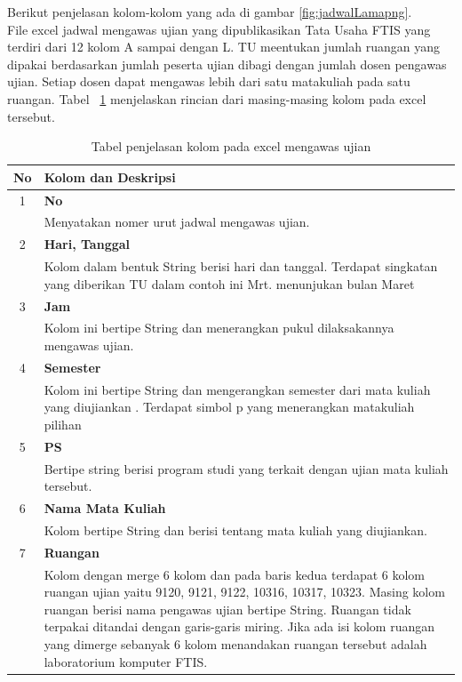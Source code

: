 Berikut penjelasan kolom-kolom yang ada di gambar \ref{fig:jadwalLamapng}.\\
File excel jadwal mengawas ujian yang dipublikasikan Tata Usaha FTIS yang terdiri dari 12 kolom A sampai dengan L. TU meentukan jumlah ruangan yang dipakai berdasarkan jumlah peserta ujian dibagi dengan jumlah dosen pengawas ujian. Setiap dosen dapat mengawas lebih dari satu matakuliah pada satu ruangan.  
Tabel ~\ref{tab:penjelasan_kolom} menjelaskan rincian dari masing-masing kolom pada excel tersebut. 
\begin{table}[H]
		\centering
		\caption{Tabel penjelasan kolom pada excel mengawas ujian}
		\label{tab:penjelasan_kolom}
\begin{tabular}{|c|p{12cm}|}
		\hline
		\textbf{No} & \textbf{Kolom dan Deskripsi} \\ \hline \hline
		1 & \textbf{No}\\
			&	Menyatakan nomer urut jadwal mengawas ujian.\\ \hline
		2 & \textbf{Hari, Tanggal}\\
			&	Kolom dalam bentuk String berisi hari dan tanggal. Terdapat singkatan yang diberikan TU dalam contoh ini  Mrt. menunjukan bulan Maret\\ \hline	
		3 & \textbf{Jam}\\
			&	Kolom ini bertipe String dan menerangkan pukul dilaksakannya mengawas ujian.\\ \hline
		4 & \textbf{Semester}\\
			&	Kolom ini bertipe String dan mengerangkan semester dari mata kuliah yang diujiankan . Terdapat simbol p yang menerangkan matakuliah pilihan\\ \hline
		5 & \textbf{PS}\\
			&	Bertipe string berisi program studi yang terkait dengan ujian mata kuliah tersebut.\\ \hline
		6 & \textbf{Nama Mata Kuliah}\\
			&	Kolom bertipe String dan berisi tentang mata kuliah yang diujiankan.\\ \hline
		7 & \textbf{Ruangan}\\
			&	Kolom dengan merge 6 kolom dan pada baris kedua terdapat 6 kolom ruangan ujian yaitu 9120, 9121, 9122, 10316, 10317, 10323. Masing kolom ruangan berisi nama pengawas ujian bertipe String. Ruangan tidak terpakai ditandai dengan garis-garis miring. Jika ada isi kolom ruangan yang dimerge sebanyak 6 kolom menandakan ruangan tersebut adalah laboratorium komputer FTIS.\\ \hline
	\end{tabular}	
\end{table}

